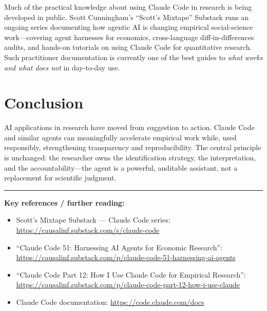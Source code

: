 \documentclass[11pt]{article}
\begin{document}
Much of the practical knowledge about using Claude Code in research is being
developed in public. Scott Cunningham's ``Scott's Mixtape'' Substack runs an
ongoing series documenting how agentic AI is changing empirical
social-science work---covering agent harnesses for economics, cross-language
diff-in-differences audits, and hands-on tutorials on using Claude Code for
quantitative research. Such practitioner documentation is currently one of
the best guides to \emph{what works and what does not} in day-to-day use.

\section{Conclusion}

AI applications in research have moved from suggestion to action. Claude
Code and similar agents can meaningfully accelerate empirical work while,
used responsibly, strengthening transparency and reproducibility. The
central principle is unchanged: the researcher owns the identification
strategy, the interpretation, and the accountability---the agent is a
powerful, auditable assistant, not a replacement for scientific judgment.

\vspace{1em}
\hrule
\vspace{0.6em}
\footnotesize
\noindent\textbf{Key references / further reading:}
\begin{itemize}[leftmargin=1.4em, itemsep=0.1em]
  \item Scott's Mixtape Substack --- Claude Code series:
        \url{https://causalinf.substack.com/s/claude-code}
  \item ``Claude Code 51: Harnessing AI Agents for Economic Research'':
        \url{https://causalinf.substack.com/p/claude-code-51-harnessing-ai-agents}
  \item ``Claude Code Part 12: How I Use Claude Code for Empirical
        Research'':
        \url{https://causalinf.substack.com/p/claude-code-part-12-how-i-use-claude}
  \item Claude Code documentation:
        \url{https://code.claude.com/docs}
\end{itemize}
\end{document}
